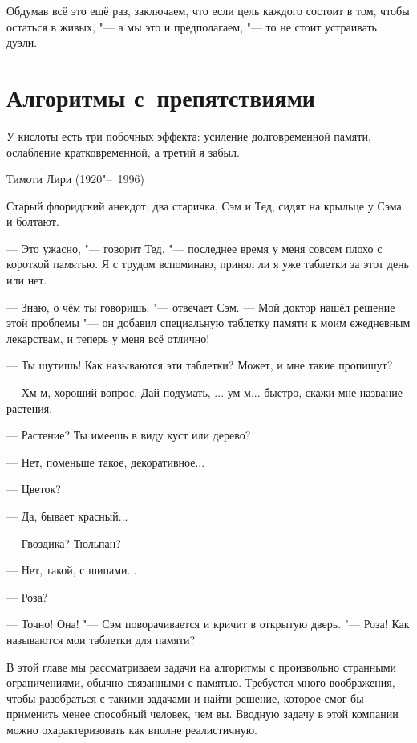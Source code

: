 \documentclass[twoside]{book}
\begin{document}
Обдумав всё это ещё раз, заключаем, что если цель каждого состоит в том, чтобы остаться в живых, "--- а мы это и предполагаем, "--- то не стоит устраивать дуэли.
\heart

\chapter{Алгоритмы с~препятствиями}

\setlength{\epigraphwidth}{.6\textwidth}
\epigraph{У кислоты есть три побочных эффекта: усиление долговременной памяти, ослабление кратковременной, а третий я забыл.\vspace{1ex}}{Тимоти Лири (1920"--~1996)}

Старый флоридский анекдот:
два старичка, Сэм и Тед, сидят на крыльце у Сэма и болтают.

--- Это ужасно, "--- говорит Тед, "--- последнее время у меня совсем плохо с короткой памятью.
Я с трудом вспоминаю, принял ли я уже таблетки за этот день или нет.

--- Знаю, о чём ты говоришь, "--- отвечает Сэм.
--- Мой доктор нашёл решение этой проблемы "--- он добавил специальную таблетку памяти к моим ежедневным лекарствам, и теперь у меня всё отлично!

--- Ты шутишь! Как называются эти таблетки? Может, и мне такие пропишут?

--- Хм-м, хороший вопрос.
Дай подумать, ... ум-м... быстро, скажи мне название растения.

--- Растение? Ты имеешь в виду куст или дерево?

--- Нет, поменьше такое, декоративное...

--- Цветок?

--- Да, бывает красный...

--- Гвоздика? Тюльпан?

--- Нет, такой, с шипами...

--- Роза?

--- Точно! Она! "--- Сэм поворачивается и кричит в открытую дверь. "--- Роза! Как называются мои таблетки для памяти?

\medskip

В этой главе мы рассматриваем задачи на алгоритмы с произвольно странными ограничениями, обычно связанными с памятью.
Требуется много воображения, чтобы разобраться с такими задачами и найти решение, которое смог бы применить менее способный человек, чем вы.
Вводную задачу в этой компании можно охарактеризовать как вполне реалистичную.
\end{document}

